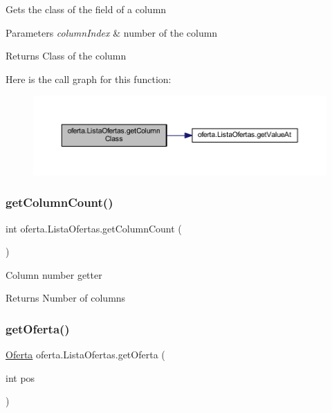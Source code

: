 Gets the class of the field of a column 
\begin{DoxyParams}{Parameters}
{\em column\+Index} & number of the column \\
\hline
\end{DoxyParams}
\begin{DoxyReturn}{Returns}
Class of the column 
\end{DoxyReturn}
Here is the call graph for this function\+:
\nopagebreak
\begin{figure}[H]
\begin{center}
\leavevmode
\includegraphics[width=350pt]{classoferta_1_1_lista_ofertas_a86faae91c71fe103470f039a09213048_cgraph}
\end{center}
\end{figure}
\mbox{\label{classoferta_1_1_lista_ofertas_a1134f680b1eb3a296d3f0db1f5f6c708}} 
\subsubsection{\texorpdfstring{get\+Column\+Count()}{getColumnCount()}}
{\footnotesize\ttfamily int oferta.\+Lista\+Ofertas.\+get\+Column\+Count (\begin{DoxyParamCaption}{ }\end{DoxyParamCaption})}

Column number getter \begin{DoxyReturn}{Returns}
Number of columns 
\end{DoxyReturn}
\mbox{\label{classoferta_1_1_lista_ofertas_aff266896ffa3bb5682ef4ecf1d514f2e}} 
\subsubsection{\texorpdfstring{get\+Oferta()}{getOferta()}}
{\footnotesize\ttfamily \mbox{\hyperlink{classoferta_1_1_oferta}{Oferta}} oferta.\+Lista\+Ofertas.\+get\+Oferta (\begin{DoxyParamCaption}\item[{int}]{pos }\end{DoxyParamCaption})}

